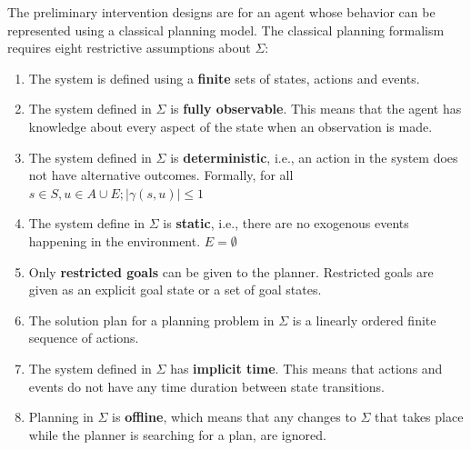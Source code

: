 The preliminary intervention designs are for an agent whose behavior can be represented using a classical planning model. The classical planning formalism requires eight restrictive assumptions about $\Sigma$:
\begin{enumerate}
\item The system is defined using a \textbf{finite} sets of states, actions and events.
\item The system defined in $\Sigma$ is \textbf{fully observable}. This means that the agent has knowledge  about every aspect of the state when an observation is made.
\item The system defined in $\Sigma$ is \textbf{deterministic}, i.e., an action in the system does not have alternative outcomes. Formally, for all $s\in S, u\in A\cup E; |\gamma(s,u)|\leq1$
\item The system define in $\Sigma$ is \textbf{static}, i.e., there are no exogenous events happening in the environment. $E=\emptyset$
\item Only \textbf{restricted goals} can be given to the planner. Restricted goals are given as an explicit goal state or a set of goal states.
\item The solution plan for a planning problem in $\Sigma$ is a linearly ordered finite sequence of actions.
\item The system defined in $\Sigma$ has \textbf{implicit time}. This means that actions and events do not have any time duration between state transitions.
\item Planning in $\Sigma$ is \textbf{offline}, which means that any changes to $\Sigma$ that takes place while the planner is searching for a plan, are ignored.
\end{enumerate}

